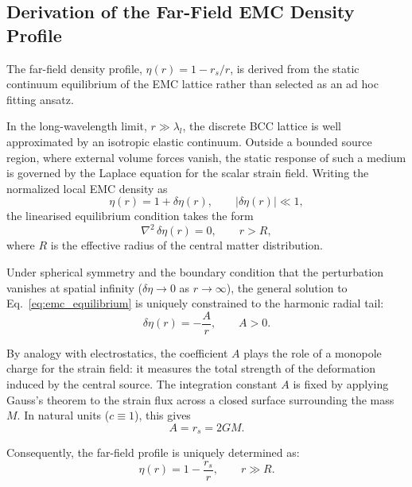 \documentclass[10pt,a4paper]{article}
\begin{document}
\subsection{Derivation of the Far-Field EMC Density Profile}
\label{sec:derivation_emc_far_field}

The far-field density profile, \(\eta(r)=1-r_s/r\), is derived from the
static continuum equilibrium of the EMC lattice rather than selected as
an ad hoc fitting ansatz.

In the long-wavelength limit, \(r \gg \lambda_l\), the discrete BCC
lattice is well approximated by an isotropic elastic continuum. Outside
a bounded source region, where external volume forces vanish, the static
response of such a medium is governed by the Laplace equation for the
scalar strain field. Writing the normalized local EMC density as
\begin{equation}
	\eta(r) = 1 + \delta\eta(r),
	\qquad
	|\delta\eta(r)| \ll 1,
\end{equation}
the linearised equilibrium condition takes the form
\begin{equation}
	\nabla^{2}\,\delta\eta(r) = 0,
	\qquad
	r > R,
	\label{eq:emc_equilibrium}
\end{equation}
where \(R\) is the effective radius of the central matter distribution.

Under spherical symmetry and the boundary condition that the perturbation
vanishes at spatial infinity (\(\delta\eta \to 0\) as \(r \to \infty\)),
the general solution to Eq.~\eqref{eq:emc_equilibrium} is uniquely
constrained to the harmonic radial tail:
\begin{equation}
	\delta\eta(r) = - \frac{A}{r},
	\qquad
	A > 0.
\end{equation}

By analogy with electrostatics, the coefficient \(A\) plays the role of a
monopole charge for the strain field: it measures the total strength of
the deformation induced by the central source. The integration constant
\(A\) is fixed by applying Gauss's theorem to the strain flux across a
closed surface surrounding the mass \(M\). In natural units (\(c \equiv 1\)),
this gives
\begin{equation}
	A = r_s = 2GM.
\end{equation}

Consequently, the far-field profile is uniquely determined as:
\begin{equation}
	\eta(r)
	=
	1 - \frac{r_s}{r},
	\qquad
	r \gg R.
	\label{eq:emc_far_field_derived}
\end{equation}
\end{document}
